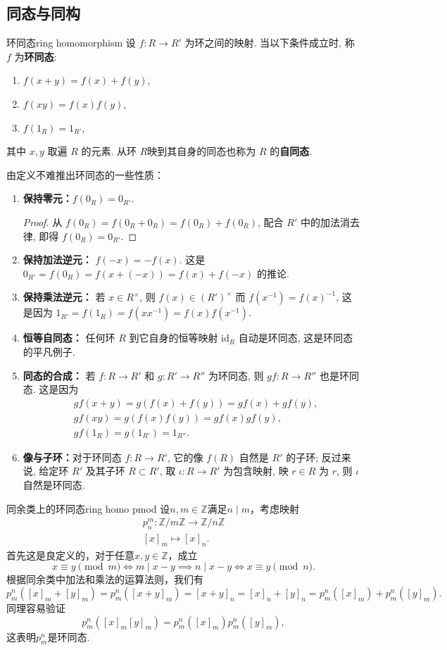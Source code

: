 \documentclass[12pt, a4paper]{ctexart}
\begin{document}
\subsection{同态与同构}
\begin{definition}{环同态}{ring homomorphism}
	设 $f : R \rightarrow R'$ 为环之间的映射. 当以下条件成立时, 称 $f$ 为\textbf{环同态}:
	\begin{enumerate}
		\item $f(x + y) = f(x) + f(y)$,
		\item $f(xy) = f(x)f(y)$,
		\item $f(1_R) = 1_{R'}$,
	\end{enumerate}
	其中 $x, y$ 取遍 $R$ 的元素. 从环 $R$映到其自身的同态也称为 $R$ 的\textbf{自同态}.
\end{definition}
由定义不难推出环同态的一些性质：\begin{enumerate}
		\item \textbf{保持零元：}$f(0_R) = 0_{R'}.$
		\begin{proof}
			从 $f(0_R) = f(0_R + 0_R) = f(0_R) + f(0_R)$, 配合 $R'$ 中的加法消去律, 即得 $f(0_R) = 0_{R'}$.
		\end{proof} 
		\item \textbf{保持加法逆元：} $f(-x) = -f(x).$ 这是 $0_{R'} = f(0_R) = f(x + (-x)) = f(x) + f(-x)$ 的推论.
		\item \textbf{保持乘法逆元：} 若 $x \in R^\times$, 则 $f(x) \in (R')^\times$ 而 $f(x^{-1}) = f(x)^{-1}$, 这是因为 $1_{R'} = f(1_R) = f(xx^{-1}) = f(x)f(x^{-1})$.
		\item \textbf{恒等自同态：} 任何环 $R$ 到它自身的恒等映射 $\text{id}_R$ 自动是环同态, 这是环同态的平凡例子.
		\item \textbf{同态的合成：} 若 $f : R \rightarrow R'$ 和 $g : R' \rightarrow R''$ 为环同态, 则 $gf : R \rightarrow R''$ 也是环同态. 这是因为
		\begin{align*}
			&gf(x + y) = g(f(x) + f(y)) = gf(x) + gf(y), \\
			&gf(xy) = g(f(x)f(y)) = gf(x)gf(y), \\
			&gf(1_R) = g(1_{R'}) = 1_{R''}.
		\end{align*}
		\item \textbf{像与子环：}对于环同态 $f : R \rightarrow R'$, 它的像 $f(R)$ 自然是 $R'$ 的子环; 反过来说, 给定环 $R'$ 及其子环 $R \subset R'$, 取 $\iota : R \rightarrow R'$ 为包含映射, 映 $r \in R$ 为 $r$, 则 $\iota$ 自然是环同态.
\end{enumerate}
\begin{example}{同余类上的环同态}{ring homo pmod}
	设$n,m\in\mathbb Z$满足$n\mid m$，考虑映射\begin{align*}
		p_n^m:\mathbb Z/m\mathbb Z\to \mathbb Z/n\mathbb Z\\ [x]_m\mapsto [x]_n.
	\end{align*}
	首先这是良定义的，对于任意$x,y\in\mathbb Z$，成立\[x\equiv y\pmod m\iff m\mid x-y\implies n\mid x-y\iff x\equiv y\pmod n.\]
	根据同余类中加法和乘法的运算法则，我们有\[p_m^n([x]_m+[y]_m)=p_m^n([x+y]_m)=[x+y]_n=[x]_n+[y]_n=p_m^n([x]_m)+p_m^n([y]_m).\]
	同理容易验证\[p_m^n([x]_m[y]_m)=p_m^n([x]_m)p_m^n([y]_m),\]
	这表明$p_m^n$是环同态. 
\end{example}
\end{document}
